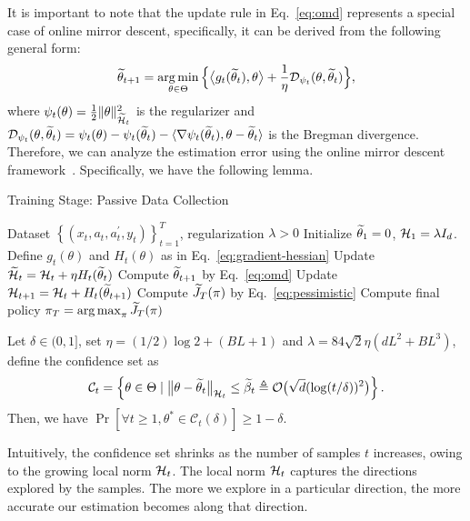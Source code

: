 It is important to note that the update rule in Eq.~\eqref{eq:omd} represents a special case of online mirror descent, specifically, it can be derived from the following general form:
\begin{align*}
  \widetilde{\theta}_{t+1}=\operatorname*{arg\,min}_{\theta \in \Theta} \Big\{\big\langle g_t(\widetilde{\theta}_t), \theta \big\rangle +\frac{1}{\eta}\mathcal{D}_{\psi_t}(\theta, \widetilde{\theta}_t)\Big\},
\end{align*}
where $\psi_t(\theta) = \frac{1}{2}\lVert\theta\rVert_{\widetilde{\mathcal{H}}_t}^2$ is the regularizer and $\mathcal{D}_{\psi_t}(\theta, \widetilde{\theta}_t) = \psi_t(\theta) - \psi_t(\widetilde{\theta}_t) - \langle \nabla \psi_t(\widetilde{\theta}_t), \theta - \widetilde{\theta}_t \rangle$ is the Bregman divergence. Therefore, we can analyze the estimation error using the online mirror descent framework~\citep{book:Orabona-online-learning}. Specifically, we have the following lemma.

\begin{algorithm}[!t]
  \caption{Training Stage: Passive Data Collection}
  \label{alg:passive}
  \begin{algorithmic}[1]
      \REQUIRE Dataset $\left\{\left(x_t, a_t, a_t^{\prime}, y_t\right)\right\}_{t=1}^{T}$, regularization $\lambda > 0$
      \STATE Initialize $\widetilde{\theta}_1=0$, $\mathcal{H}_1 = \lambda I_d$.
      \STATE Define $g_t(\theta)$ and $H_t(\theta)$ as in Eq.~\eqref{eq:gradient-hessian}
      \STATE Update $\widetilde{\mathcal{H}}_t = \mathcal{H}_t + \eta H_t(\widetilde{\theta}_t)$
      \STATE Compute $\widetilde{\theta}_{t+1}$ by Eq.~\eqref{eq:omd}
      \STATE Update $\mathcal{H}_{t+1} = \mathcal{H}_{t} + H_t(\widetilde{\theta}_{t+1})$
      \ENDFOR
      \STATE Compute $\widetilde{J}_T(\pi)$ by Eq.~\eqref{eq:pessimistic}
      \ENSURE Compute final policy  $\pi_T= \operatorname*{arg\,max}_{\pi} \widetilde{J}_T(\pi)$
  \end{algorithmic}
\end{algorithm}

\begin{myLemma}
  \label{lem:confidence_set}
  Let $\delta \in(0,1]$, set $\eta=(1 / 2) \log 2+\left(BL+1\right)$ and $\lambda=84 \sqrt{2} \eta (dL^2 + BL^3)$, define the confidence set as
  \begin{align*}
    \mathcal{C}_t =\left\{\theta \in \Theta \mid\big\|\theta - \widetilde{\theta}_t\big\|_{\mathcal{H}_t} \leq \widetilde{\beta}_t\triangleq \mathcal{O} \big(\sqrt{d}(\log (t / \delta))^2\big) \right\}.
  \end{align*}
  Then, we have $\operatorname{Pr}\left[\forall t \geqslant 1, \theta^* \in \mathcal{C}_t(\delta)\right] \geqslant 1-\delta$.
\end{myLemma}
Intuitively, the confidence set shrinks as the number of samples $t$ increases, owing to the growing local norm $\mathcal{H}_t$. The local norm $\mathcal{H}_t$ captures the directions explored by the samples. The more we explore in a particular direction, the more accurate our estimation becomes along that direction.


